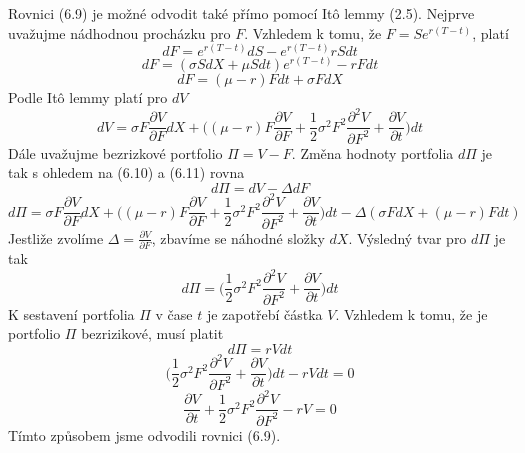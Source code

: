 \documentclass[a4paper]{book}
\begin{document}
Rovnici (6.9) je možné odvodit také přímo pomocí It\^o lemmy (2.5). Nejprve uvažujme nádhodnou procházku pro $F$. Vzhledem k tomu, že $F = Se^{r(T - t)}$, platí
\begin{equation*}
dF = e^{r(T-t)}dS - e^{r(T - t)}rSdt
\end{equation*}
\begin{equation*}
dF = (\sigma S dX + \mu S dt)e^{r(T - t)} - r Fdt
\end{equation*}
\begin{equation}
dF = (\mu - r)F dt + \sigma F dX
\end{equation}
Podle It\^o lemmy platí pro $dV$
\begin{equation}
dV = \sigma F \frac{\partial V}{\partial F}dX + \bigg( (\mu - r) F \frac{\partial V}{\partial F} + \frac{1}{2}\sigma^2 F^2\frac{\partial^2 V}{\partial F^2} + \frac{\partial V}{\partial t} \bigg)dt
\end{equation}
Dále uvažujme bezrizkové portfolio $\Pi = V - F$. Změna hodnoty portfolia $d \Pi$ je tak s ohledem na (6.10) a (6.11) rovna
\begin{equation*}
d \Pi = dV - \Delta dF
\end{equation*}
\begin{equation*}
d \Pi = \sigma F \frac{\partial V}{\partial F}dX + \bigg( (\mu - r) F \frac{\partial V}{\partial F} + \frac{1}{2}\sigma^2 F^2\frac{\partial^2 V}{\partial F^2} + \frac{\partial V}{\partial t} \bigg)dt - \Delta(\sigma F dX + (\mu -r)Fdt)
\end{equation*}
Jestliže zvolíme $\Delta = \frac{\partial V}{\partial F}$, zbavíme se náhodné složky $dX$. Výsledný tvar pro $d\Pi$ je tak
\begin{equation*}
d \Pi = \bigg( \frac{1}{2}\sigma^2 F^2\frac{\partial^2 V}{\partial F^2} + \frac{\partial V}{\partial t} \bigg)dt
\end{equation*}
K sestavení portfolia $\Pi$ v čase $t$ je zapotřebí částka $V$. Vzhledem k tomu, že je portfolio $\Pi$ bezrizikové, musí platit
\begin{equation*}
d \Pi = r V dt
\end{equation*}
\begin{equation*}
\bigg( \frac{1}{2}\sigma^2 F^2\frac{\partial^2 V}{\partial F^2} + \frac{\partial V}{\partial t} \bigg)dt - r V dt = 0
\end{equation*}
\begin{equation*}
\frac{\partial V}{\partial t} + \frac{1}{2}\sigma^2 F^2\frac{\partial^2 V}{\partial F^2} - r V = 0
\end{equation*}
Tímto způsobem jsme odvodili rovnici (6.9).
\end{document}

